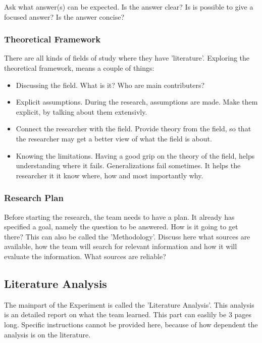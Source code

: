 \documentclass[10pt]{report}
\begin{document}
Ask what answer(s) can be expected. Is the answer clear? Is is possible to give a focused answer? Is the answer concise?

\subsubsection{Theoretical Framework}

There are all kinds of fields of study where they have 'literature'. Exploring the theoretical framework, means a couple of things:

\begin{itemize}
	\item Discussing the field. What is it? Who are main contributers?
	\item Explicit assumptions. During the research, assumptions are made. Make them explicit, by talking about them extensivly.
	\item Connect the researcher with the field. Provide theory from the field, so that the researcher may get a better view of what the field is about.
	\item Knowing the limitations. Having a good grip on the theory of the field, helps understanding where it fails. Generalizations fail sometimes. It helps the researcher it it know where, how and most importantly why.
\end{itemize}

\subsubsection{Research Plan}

Before starting the research, the team needs to have a plan. It already has specified a goal, namely the question to be answered. How is it going to get there? This can also be called the 'Methodology'. Discuss here what sources are available, how the team will search for relevant information and how it will evaluate the information. What sources are reliable?

\subsection{Literature Analysis}

The mainpart of the Experiment is called the 'Literature Analysis'. This analysis is an detailed report on what the team learned. This part can easlily be 3 pages long. Specific instructions cannot be provided here, because of how dependent the analysis is on the literature.
\end{document}
